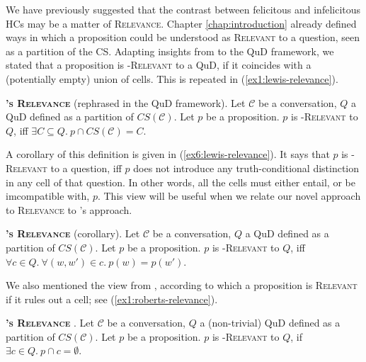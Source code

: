 We have previously suggested that the contrast between felicitous and infelicitous HCs may be a matter of \textsc{Relevance}. Chapter \ref{chap:introduction} already defined ways in which a proposition could be understood as \textsc{Relevant} to a question, seen as a partition of the CS. Adapting insights from \citet{Lewis1988} to the QuD framework, we stated that a proposition is \textsc{\citeauthor{Lewis1988}-Relevant} to a QuD, if it coincides with a (potentially empty) union of cells. This is repeated in (\ref{ex1:lewis-relevance}). 

\begin{exe}
	 {\textsc{\textbf{\citeauthor{Lewis1988}'s Relevance}} (rephrased in the QuD framework). Let $\mathcal{C}$ be a conversation, $Q$ a QuD defined as a partition of $CS(\mathcal{C})$. Let $p$ be a proposition. $p$ is \textsc{\citeauthor{Lewis1988}-Relevant} to $Q$, iff $\exists C \subseteq Q. \ p \cap CS(\mathcal{C}) = C$.}
\end{exe}

A corollary of this definition is given in (\ref{ex6:lewis-relevance}). It says that $p$ is \textsc{\citeauthor{Lewis1988}-Relevant} to a question, iff $p$ does not introduce any truth-conditional distinction in any cell of that question. In other words, all the cells must either entail, or be imcompatible with, $p$. This view will be useful when we relate our novel approach to \textsc{Relevance} to \citeauthor{Lewis1988}'s approach.

\begin{exe}
	\ex\label{ex6:lewis-relevance} {\textsc{\textbf{\citeauthor{Lewis1988}'s Relevance}} (corollary). Let $\mathcal{C}$ be a conversation, $Q$ a QuD defined as a partition of $CS(\mathcal{C})$. Let $p$ be a proposition. $p$ is \textsc{\citeauthor{Lewis1988}-Relevant} to $Q$, iff $\forall c \in Q. \ \forall (w, w') \in c. \  p(w) = p(w')$.}
\end{exe}

We also mentioned the view from \citet{Roberts2012}, according to which a proposition is \textsc{Relevant} if it rules out a cell; see (\ref{ex1:roberts-relevance}). 

\begin{exe}
	 {\textsc{\textbf{\citeauthor{Roberts2012}'s Relevance}} \citep{Roberts2012}. Let $\mathcal{C}$ be a conversation, $Q$ a (non-trivial) QuD defined as a partition of $CS(\mathcal{C})$. Let $p$ be a proposition. $p$ is \textsc{\citeauthor{Roberts2012}-Relevant} to $Q$, if $\exists c \in Q. \ p \cap c = \emptyset$.
	}
\end{exe}





